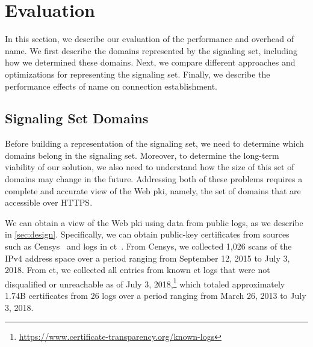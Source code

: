 \section{Evaluation}
\label{sec:evaluation}

In this section, we describe our evaluation of the performance and overhead of
\ac{name}. We first describe the domains represented by the signaling set,
including how we determined these domains. Next, we compare different approaches
and optimizations for representing the signaling set. Finally, we describe the
performance effects of \ac{name} on connection establishment.

\subsection{Signaling Set Domains}
\label{sec:evaluation:https}

Before building a representation of the signaling set, we need to determine
which domains belong in the signaling set. Moreover, to determine the long-term
viability of our solution, we also need to understand how the size of this set
of domains may change in the future. Addressing both of these problems requires
a complete and accurate view of the Web \ac{pki}, namely, the set of domains
that are accessible over HTTPS.

We can obtain a view of the Web \ac{pki} using data from public logs, as we
describe in \autoref{sec:design}. Specifically, we can obtain public-key
certificates from sources such as Censys~\cite{durumeric2015search} and logs in
\ac{ct}~\cite{rfc6962}. From Censys, we collected 1,026 scans of the IPv4
address space over a period ranging from September 12, 2015 to July 3, 2018.
From \ac{ct}, we collected all entries from known \ac{ct} logs that were not
disqualified or unreachable as of July 3,
2018,\footnote{\url{https://www.certificate-transparency.org/known-logs}} which
totaled approximately 1.74B certificates from 26 logs over a period ranging from
March 26, 2013 to July 3, 2018.

